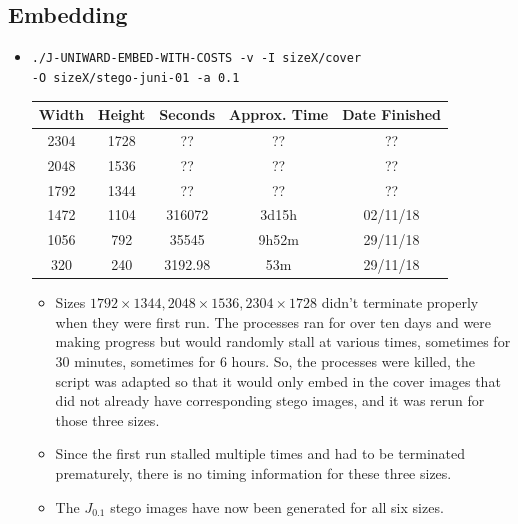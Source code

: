 \documentclass[11pt,a4paper]{report}
\begin{document}
\subsection{Embedding}
\begin{itemize}
\item \texttt{./J-UNIWARD-EMBED-WITH-COSTS -v -I sizeX/cover} \\
         \texttt{-O sizeX/stego-juni-01 -a 0.1}
  \begin{center}
  \begin{tabular}{ c c | c c c }
  Width & Height & Seconds & Approx. Time & Date Finished \\ \hline
  2304 & 1728 & ?? & ?? & ?? \\
  2048 & 1536 & ?? & ?? & ?? \\
  1792 & 1344 & ?? & ?? & ?? \\
  1472 & 1104 & 316072 & 3d15h & 02/11/18 \\
  1056 & 792 & 35545 & 9h52m & 29/11/18 \\
  320 & 240 & 3192.98 & 53m & 29/11/18 \\
  \end{tabular}
  \end{center}
  \begin{itemize}
  \item Sizes $1792 \times 1344, 2048 \times 1536, 2304 \times 1728$ didn't terminate properly when they were first run. The processes ran for over ten days and were making progress but would randomly stall at various times, sometimes for 30 minutes, sometimes for 6 hours. So, the processes were killed, the script was adapted so that it would only embed in the cover images that did not already have corresponding stego images, and it was rerun for those three sizes.
  \item Since the first run stalled multiple times and had to be terminated prematurely, there is no timing information for these three sizes.
  \item The $J_{0.1}$ stego images have now been generated for all six sizes.
  \end{itemize}
\end{itemize}
\end{document}
